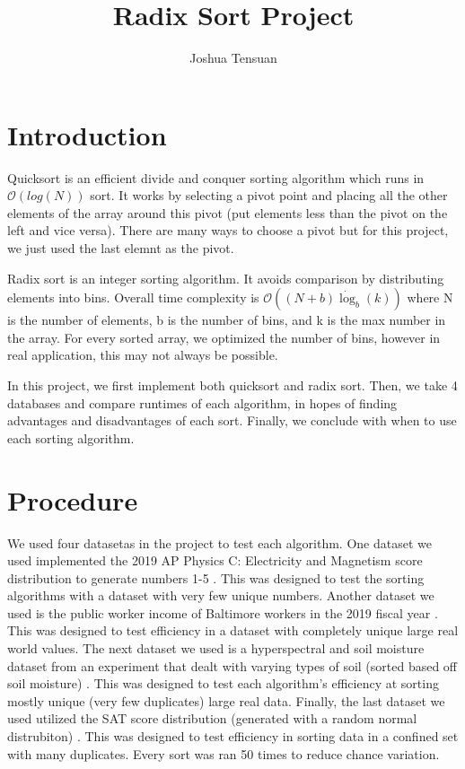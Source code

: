 \documentclass[11pt]{article}
\begin{document}
\author{Joshua Tensuan}
\title{Radix Sort Project}
\maketitle

\medskip

\section{Introduction}

Quicksort is an efficient divide and conquer sorting algorithm which runs in $\mathcal{O} (log(N))$ sort. It works by selecting a pivot point and placing all the other elements of the array around this pivot (put elements less than the pivot on the left and vice versa). There are many ways to choose a pivot but for this project, we just used the last elemnt as the pivot. 

Radix sort is an integer sorting algorithm. It avoids comparison by distributing elements into bins. Overall time complexity is $\mathcal{O} ((N+b)\dot \log _b (k))$ where N is the number of elements, b is the number of bins, and k is the max number in the array. For every sorted array, we optimized the number of bins, however in real application, this may not always be possible.

In this project, we first implement both quicksort and radix sort. Then, we take 4 databases and compare runtimes of each algorithm, in hopes of finding advantages and disadvantages of each sort. Finally, we conclude with when to use each sorting algorithm.

\section{Procedure}

We used four datasetas in the project to test each algorithm. One dataset we used implemented the 2019 AP Physics C: Electricity and Magnetism score distribution to generate numbers 1-5 \cite{apphys}. This was designed to test the sorting algorithms with a dataset with very few unique numbers. Another dataset we used is the public worker income of Baltimore workers in the 2019 fiscal year \cite{baltimore}. This was designed to test efficiency in a dataset with completely unique large real world values. The next dataset we used is a hyperspectral and soil moisture dataset from an experiment that dealt with varying types of soil (sorted based off soil moisture) \cite{riesekeller2018}. This was designed to test each algorithm's efficiency at sorting mostly unique (very few duplicates) large real data. Finally, the last dataset we used utilized the SAT score distribution (generated with a random normal distrubiton) \cite{sat}. This was designed to test efficiency in sorting data in a confined set with many duplicates. Every sort was ran 50 times to reduce chance variation.
\end{document}

